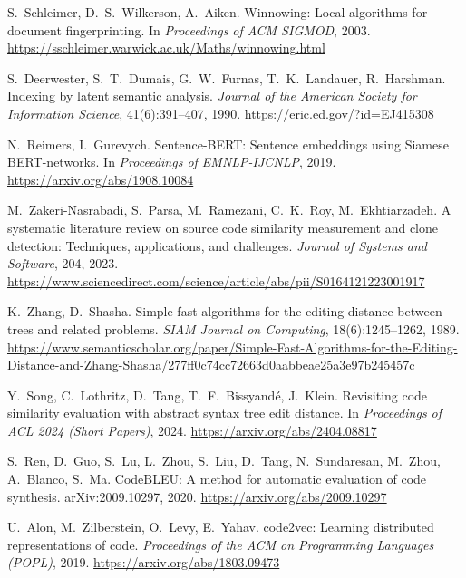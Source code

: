 S.~Schleimer, D.~S.~Wilkerson, A.~Aiken. \newblock Winnowing: Local algorithms for document fingerprinting. \newblock In \emph{Proceedings of ACM SIGMOD}, 2003. \newblock \url{https://sschleimer.warwick.ac.uk/Maths/winnowing.html}

 S.~Deerwester, S.~T.~Dumais, G.~W.~Furnas, T.~K.~Landauer, R.~Harshman. \newblock Indexing by latent semantic analysis. \newblock \emph{Journal of the American Society for Information Science}, 41(6):391--407, 1990. \newblock \url{https://eric.ed.gov/?id=EJ415308}

 N.~Reimers, I.~Gurevych. \newblock Sentence-BERT: Sentence embeddings using Siamese BERT-networks. \newblock In \emph{Proceedings of EMNLP-IJCNLP}, 2019. \newblock \url{https://arxiv.org/abs/1908.10084}

 M.~Zakeri-Nasrabadi, S.~Parsa, M.~Ramezani, C.~K.~Roy, M.~Ekhtiarzadeh. \newblock A systematic literature review on source code similarity measurement and clone detection: Techniques, applications, and challenges. \newblock \emph{Journal of Systems and Software}, 204, 2023. \newblock \url{https://www.sciencedirect.com/science/article/abs/pii/S0164121223001917}

 K.~Zhang, D.~Shasha. \newblock Simple fast algorithms for the editing distance between trees and related problems. \newblock \emph{SIAM Journal on Computing}, 18(6):1245--1262, 1989. \newblock \url{https://www.semanticscholar.org/paper/Simple-Fast-Algorithms-for-the-Editing-Distance-and-Zhang-Shasha/277ff0c74cc72663d0aabbeae25a3e97b245457c}

 Y.~Song, C.~Lothritz, D.~Tang, T.~F.~Bissyandé, J.~Klein. \newblock Revisiting code similarity evaluation with abstract syntax tree edit distance. \newblock In \emph{Proceedings of ACL 2024 (Short Papers)}, 2024. \newblock \url{https://arxiv.org/abs/2404.08817}

 S.~Ren, D.~Guo, S.~Lu, L.~Zhou, S.~Liu, D.~Tang, N.~Sundaresan, M.~Zhou, A.~Blanco, S.~Ma. \newblock CodeBLEU: A method for automatic evaluation of code synthesis. \newblock arXiv:2009.10297, 2020. \newblock \url{https://arxiv.org/abs/2009.10297}

 U.~Alon, M.~Zilberstein, O.~Levy, E.~Yahav. \newblock code2vec: Learning distributed representations of code. \newblock \emph{Proceedings of the ACM on Programming Languages (POPL)}, 2019. \newblock \url{https://arxiv.org/abs/1803.09473}

